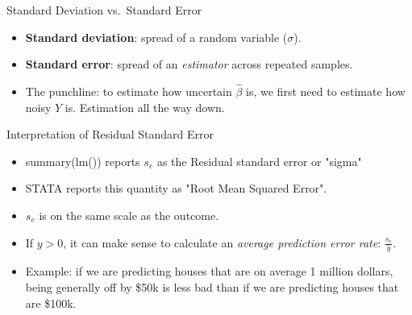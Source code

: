 \documentclass[aspectratio=169, handout]{beamer}
\numberwithin{equation}{section}
\begin{document}
\begin{frame}{Standard Deviation vs.\ Standard Error}
\begin{center}
\end{center}
\vspace{0.3em}
\begin{itemize}
\item \textbf{Standard deviation}: spread of a random variable ($\sigma$).
\item \textbf{Standard error}: spread of an \emph{estimator} across repeated samples.\pause
\item The punchline: to estimate how uncertain $\hat{\beta}$ is, we first need to estimate how noisy $Y$ is. Estimation all the way down.
\end{itemize}
\end{frame}


\begin{frame}{Interpretation of Residual Standard Error}
\begin{itemize}
\item summary(lm()) reports $s_e$ as the Residual standard error or "sigma"
\item STATA reports this quantity as "Root Mean Squared Error".
\item $s_e$ is on the same scale as the outcome. 
\item If $y>0$, it can make sense to calculate an \emph{average prediction error rate}: $\frac{s_e}{\bar{y}}$.
\item Example: if we are predicting houses that are on average 1 million dollars, being generally off by \$50k is less bad than if we are predicting houses that are \$100k.
\end{itemize}
\end{frame}
\end{document}
